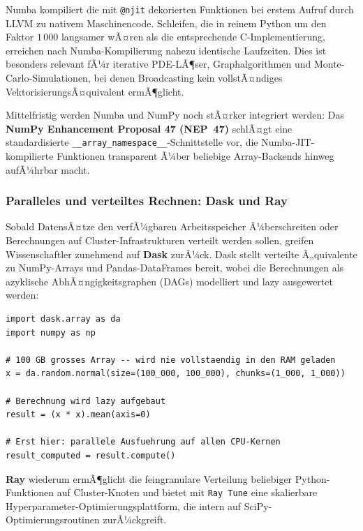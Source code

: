 \documentclass[12pt, a4paper]{article}
\begin{document}
Numba kompiliert die mit \texttt{@njit} dekorierten Funktionen bei erstem
Aufruf durch LLVM zu nativem Maschinencode. Schleifen, die in reinem Python
um den Faktor $1\,000$ langsamer wÃ¤ren als die entsprechende C-Implementierung,
erreichen nach Numba-Kompilierung nahezu identische Laufzeiten. Dies ist
besonders relevant fÃ¼r iterative PDE-LÃ¶ser, Graphalgorithmen und
Monte-Carlo-Simulationen, bei denen Broadcasting kein vollstÃ¤ndiges
VektorisierungsÃ¤quivalent ermÃ¶glicht.

Mittelfristig werden Numba und NumPy noch stÃ¤rker integriert werden:
Das \textbf{NumPy Enhancement Proposal 47 (NEP~47)} schlÃ¤gt eine
standardisierte \texttt{\_\_array\_namespace\_\_}-Schnittstelle vor, die
Numba-JIT-kompilierte Funktionen transparent Ã¼ber beliebige Array-Backends
hinweg aufÃ¼hrbar macht.

\subsubsection{Paralleles und verteiltes Rechnen: Dask und Ray}
\label{subsubsec:dask}

Sobald DatensÃ¤tze den verfÃ¼gbaren Arbeitsspeicher Ã¼berschreiten oder
Berechnungen auf Cluster-Infrastrukturen verteilt werden sollen, greifen
Wissenschaftler zunehmend auf \textbf{Dask} zurÃ¼ck. Dask stellt verteilte
Ã„quivalente zu NumPy-Arrays und Pandas-DataFrames bereit, wobei die
Berechnungen als azyklische AbhÃ¤ngigkeitsgraphen (DAGs) modelliert und
lazy ausgewertet werden:

\begin{lstlisting}[caption={Dask: Out-of-Core-NumPy fuer gro\ss{}e Datensaetze}]
import dask.array as da
import numpy as np

# 100 GB grosses Array -- wird nie vollstaendig in den RAM geladen
x = da.random.normal(size=(100_000, 100_000), chunks=(1_000, 1_000))

# Berechnung wird lazy aufgebaut
result = (x * x).mean(axis=0)

# Erst hier: parallele Ausfuehrung auf allen CPU-Kernen
result_computed = result.compute()
\end{lstlisting}

\textbf{Ray} wiederum ermÃ¶glicht die feingranulare Verteilung beliebiger
Python-Funktionen auf Cluster-Knoten und bietet mit \texttt{Ray Tune}
eine skalierbare Hyperparameter-Optimierungsplattform, die intern auf
SciPy-Optimierungsroutinen zurÃ¼ckgreift.
\end{document}
